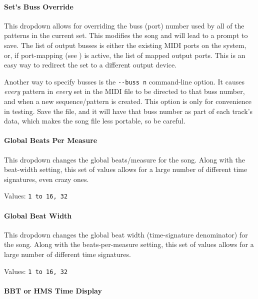 \documentclass[
 11pt,
 twoside,
 a4paper,
 final                                 %
]{article}
\begin{document}
\paragraph{Set's Buss Override}
\label{paragraph:introduction_sets_buss_override}

   This dropdown allows for overriding the buss (port) number used by all of
   the patterns in the current set.  This modifies the song and will lead to a
   prompt to save.
   The list of
   output busses is either the existing MIDI ports on the system, or,
   if port-mapping (see ) is active, the list
   of mapped output ports.
   This is an easy way to redirect the set to a different output device.

   Another way to specify busses is the
   \texttt{-{}-buss n} command-line option.
   It causes \textsl{every} pattern in \textsl{every} set in the MIDI
   file to be directed to that buss number, and when a new
   sequence/pattern is created.  This option is only
   for convenience in testing.  Save the file, and it will
   have that buss number as part of each track's data, which makes the song
   file less portable, so be careful.

\paragraph{Global Beats Per Measure}
\label{paragraph:introduction_global_beats_per_measure}

   This dropdown changes the global beats/measure for the song.
   Along with the beat-width setting, this set of values allows
   for a large number of different time signatures, even crazy ones.

   Values: \texttt{1 to 16, 32}

\paragraph{Global Beat Width}
\label{paragraph:introduction_global_beat_width}

   This dropdown changes the global beat width (time-signature denominator)
   for the song.
   Along with the beats-per-measure setting, this set of values allows
   for a large number of different time signatures.

   Values: \texttt{1 to 16, 32}

\paragraph{BBT or HMS Time Display}
\label{paragraph:introduction_time_display}
\end{document}
